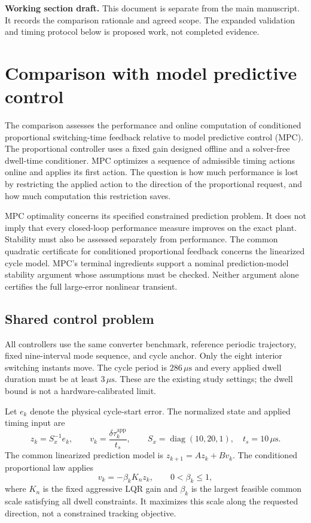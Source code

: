 \documentclass[11pt,a4paper]{article}
\begin{document}
\noindent\textbf{Working section draft.} This document is separate from the main
manuscript. It records the comparison rationale and agreed scope. The expanded
validation and timing protocol below is proposed work, not completed evidence.

\section{Comparison with model predictive control}
\label{sec:mpc-comparison-draft}

The comparison assesses the performance and online computation of conditioned
proportional switching-time feedback relative to model predictive control
(MPC). The proportional controller uses a fixed gain designed offline and a
solver-free dwell-time conditioner. MPC optimizes a sequence of admissible
timing actions online and applies its first action. The question is how much
performance is lost by restricting the applied action to the direction of the
proportional request, and how much computation this restriction saves.

MPC optimality concerns its specified constrained prediction problem. It does
not imply that every closed-loop performance measure improves on the exact
plant. Stability must also be assessed separately from performance. The
common quadratic certificate for conditioned proportional feedback concerns
the linearized cycle model. MPC's terminal ingredients support a nominal
prediction-model stability argument whose assumptions must be checked. Neither
argument alone certifies the full large-error nonlinear transient.

\subsection{Shared control problem}

All controllers use the same converter benchmark, reference periodic trajectory,
fixed nine-interval mode sequence, and cycle anchor. Only the eight interior
switching instants move. The cycle period is $286\,\mu\mathrm{s}$ and every
applied dwell duration must be at least $3\,\mu\mathrm{s}$. These are the
existing study settings; the dwell bound is not a hardware-calibrated limit.

Let $e_k$ denote the physical cycle-start error. The normalized state and
applied timing input are
\[
    z_k=S_x^{-1}e_k,\qquad
    v_k=\frac{\delta\tau_k^{\mathrm{app}}}{t_s},\qquad
    S_x=\operatorname{diag}(10,20,1),\quad t_s=10\,\mu\mathrm{s}.
\]
The common linearized prediction model is $z_{k+1}=Az_k+Bv_k$.
The conditioned proportional law applies
\[
    v_k=-\beta_k K_n z_k,\qquad 0<\beta_k\leq 1,
\]
where $K_n$ is the fixed aggressive LQR gain and $\beta_k$ is the largest
feasible common scale satisfying all dwell constraints. It maximizes this
scale along the requested direction, not a constrained tracking objective.
\end{document}
